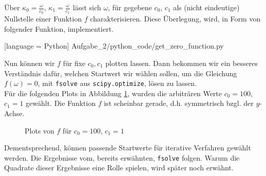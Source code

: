 Über $\kappa_0 = \frac{\omega}{c_0}$, $\kappa_1 = \frac{\omega}{c_1}$ lässt sich $\omega$, für gegebene $c_0$, $c_1$ als (nicht eindeutige) Nullstelle einer Funktion $f$ charakterisieren. Diese Überlegung, wird, in Form von folgender Funktion, implementiert.


[language = Python]
{Aufgabe_2/python_code/get_zero_function.py}

Nun können wir $f$ für fixe $c_0, c_1$ plotten lassen. Dann bekommen wir ein besseres Verständnis dafür, welchen Startwert wir wählen sollen, um die Gleichung $f(\omega) = 0$, mit \verb|fsolve| aus \verb|scipy.optimize|, lösen zu lassen. \\

Für die folgenden Plots in Abbildung \ref{fig:zero_function}, wurden die arbiträren Werte $c_0 = 100$, $c_1 = 1$ gewählt. Die Funktion $f$ ist scheinbar gerade, d.h. symmetrisch bzgl. der $y$-Achse.

\begin{figure}[h!]
  \centering
  \hspace{0mm}
  \caption{Plots von $f$ für $c_0 = 100$, $c_1 = 1$}
  \label{fig:zero_function}
\end{figure}

Dementsprechend, können passende Startwerte für iterative Verfahren gewählt werden. Die Ergebnisse vom, bereits erwähnten, \verb|fsolve| folgen. Warum die Quadrate dieser Ergebnisse eine Rolle spielen, wird später noch erwähnt.

